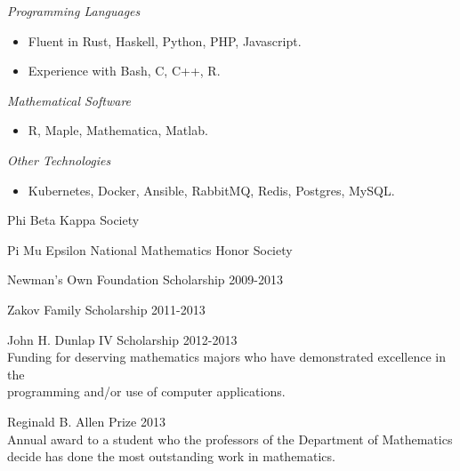 \documentclass[11pt,article,oneside]{memoir}
\begin{document}




\ind \emph{Programming Languages}
\small
\begin{itemize}
  \item Fluent in Rust, Haskell, Python, PHP, Javascript.
  \item Experience with Bash, C, C++, R.
\end{itemize}
\normalsize

\ind \emph{Mathematical Software}
\small
\begin{itemize}
  \item R, Maple, Mathematica, Matlab.
\end{itemize}
\normalsize

\ind \emph{Other Technologies}
\small
\begin{itemize}
  \item Kubernetes, Docker, Ansible, RabbitMQ, Redis, Postgres, MySQL.
\end{itemize}
\normalsize

\bigskip


\ind Phi Beta Kappa Society

\ind Pi Mu Epsilon National Mathematics Honor Society

\ind Newman's Own Foundation Scholarship \hfill {\small 2009-2013}

\ind Zakov Family Scholarship \hfill {\small 2011-2013}

\ind John H. Dunlap IV Scholarship \hfill {\small 2012-2013} \\
\footnotesize
  Funding for deserving mathematics majors who have demonstrated excellence in
  the \\ programming and/or use of computer applications.
\normalsize

\ind Reginald B. Allen Prize \hfill {\small 2013} \\
\footnotesize
  Annual award to a student who the professors of the Department of
  Mathematics decide has done the most outstanding work in mathematics.
\normalsize
\end{document}
